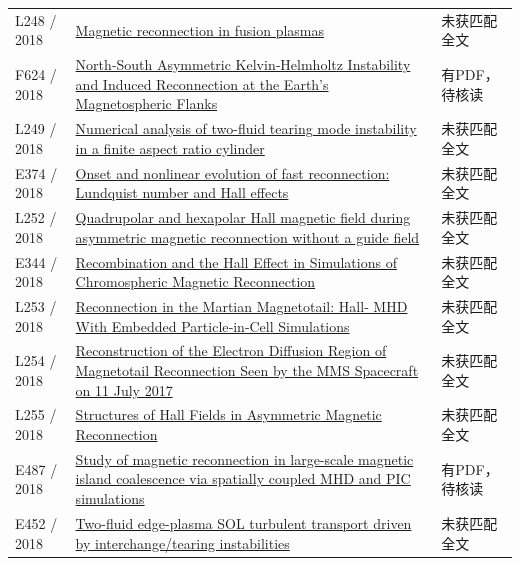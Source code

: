 \begin{longtable}{P{24mm}P{97mm}P{27mm}}
L248 / 2018 & \href{http://paduaresearch.cab.unipd.it/10907/1/tesi_Luigi_Cordaro.pdf}{Magnetic reconnection in fusion plasmas} & 未获匹配全文\\

F624 / 2018 & \href{https://doi.org/10.1029/2018ja025626}{North‐South Asymmetric Kelvin‐Helmholtz Instability and Induced Reconnection at the Earth's Magnetospheric Flanks} & 有PDF，待核读\\

L249 / 2018 & \href{https://doi.org/10.1063/1.5009389}{Numerical analysis of two-fluid tearing mode instability in a finite aspect ratio cylinder} & 未获匹配全文\\

E374 / 2018 & \href{http://ui.adsabs.harvard.edu/abs/2018shin.confE.240S/abstract}{Onset and nonlinear evolution of fast reconnection: Lundquist number and Hall effects} & 未获匹配全文\\

L252 / 2018 & \href{https://doi.org/10.1063/1.5030439}{Quadrupolar and hexapolar Hall magnetic field during asymmetric magnetic reconnection without a guide field} & 未获匹配全文\\

E344 / 2018 & \href{http://ui.adsabs.harvard.edu/abs/2018shin.confE.188M/abstract}{Recombination and the Hall Effect in Simulations of Chromospheric Magnetic Reconnection} & 未获匹配全文\\

L253 / 2018 & \href{https://doi.org/10.1029/2017ja024729}{Reconnection in the Martian Magnetotail: Hall‐ MHD With Embedded Particle‐in‐Cell Simulations} & 未获匹配全文\\

L254 / 2018 & \href{https://doi.org/10.1029/2018ja026051}{Reconstruction of the Electron Diffusion Region of Magnetotail Reconnection Seen by the MMS Spacecraft on 11 July 2017} & 未获匹配全文\\

L255 / 2018 & \href{https://doi.org/10.1029/2018ja025251}{Structures of Hall Fields in Asymmetric Magnetic Reconnection} & 未获匹配全文\\

E487 / 2018 & \href{https://doi.org/10.1063/1.5037774}{Study of magnetic reconnection in large-scale magnetic island coalescence via spatially coupled MHD and PIC simulations} & 有PDF，待核读\\

E452 / 2018 & \href{https://meetings.aps.org/Meeting/DPP18/Session/CO5.1}{Two-fluid edge-plasma SOL turbulent transport driven by interchange/tearing instabilities} & 未获匹配全文\\


\end{longtable}

